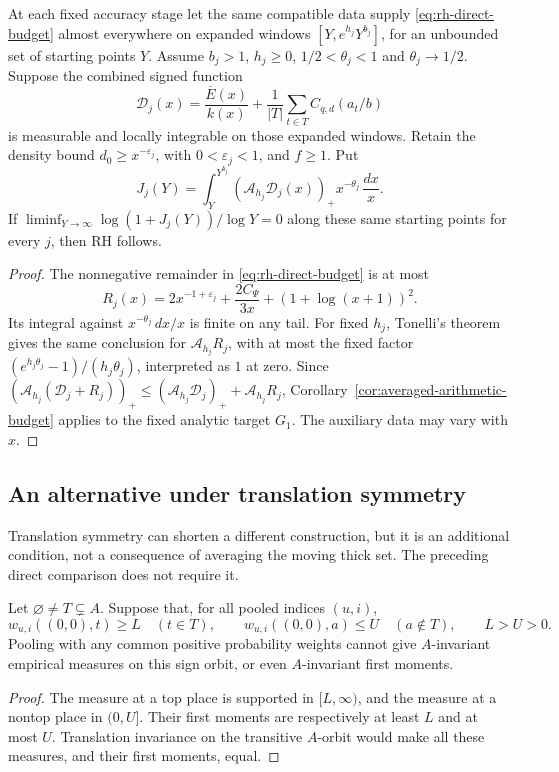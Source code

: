 \begin{corollary}
\label{rh-averaged-final}
At each fixed accuracy stage let the same compatible data supply
\eqref{eq:rh-direct-budget} almost everywhere on expanded windows
$[Y,e^{h_j}Y^{b_j}]$, for an unbounded set of starting points $Y$.
Assume $b_j>1$, $h_j\ge0$, $1/2<\theta_j<1$ and
$\theta_j\to1/2$. Suppose the combined signed function
\[
 \mathcal D_j(x)=\frac{\overline E(x)}{k(x)}
   +\frac1{|T|}\sum_{t\in T} C_{q,d}(a_t/b)
\]
is measurable and locally integrable on those expanded windows.
Retain the density bound $d_0\ge x^{-\varepsilon_j}$, with
$0<\varepsilon_j<1$, and $f\ge1$.
Put
\[
 J_j(Y)=\int_Y^{Y^{b_j}}(\mathcal A_{h_j}\mathcal D_j(x))_+
                   x^{-\theta_j}\,\frac{dx}{x}.
\]
If $\liminf_{Y\to\infty}\log(1+J_j(Y))/\log Y=0$ along these same
starting points for every $j$, then RH follows.
\end{corollary}
\begin{proof}
The nonnegative remainder in \eqref{eq:rh-direct-budget} is at most
\[
 R_j(x)=2x^{-1+\varepsilon_j}+\frac{2C_\Psi}{3x}
                         +(1+\log(x+1))^2.
\]
Its integral against $x^{-\theta_j}\,dx/x$ is finite on any tail.
For fixed $h_j$, Tonelli's theorem gives the same conclusion for
$\mathcal A_{h_j}R_j$, with at most the fixed factor
$(e^{h_j\theta_j}-1)/(h_j\theta_j)$, interpreted as $1$ at zero.
Since $(\mathcal A_{h_j}(\mathcal D_j+R_j))_+
\le(\mathcal A_{h_j}\mathcal D_j)_++\mathcal A_{h_j}R_j$,
Corollary~\ref{cor:averaged-arithmetic-budget} applies to the fixed
analytic target $G_1$. The auxiliary data may vary with $x$.
\end{proof}

\subsection{An alternative under translation symmetry}

Translation symmetry can shorten a different construction, but it is
an additional condition, not a consequence of averaging the moving
thick set. The preceding direct comparison does not require it.

\begin{lemma}
\label{rh-separated-support-obstruction}
Let $\varnothing\ne T\subsetneq A$. Suppose that, for all pooled
indices $(u,i)$,
\[
 w_{u,i}((0,0),t)\ge L\quad(t\in T),\qquad
 w_{u,i}((0,0),a)\le U\quad(a\notin T),
 \qquad L>U>0.
\]
Pooling with any common positive probability weights cannot give
$A$-invariant empirical measures on this sign orbit, or even
$A$-invariant first moments.
\end{lemma}
\begin{proof}
The measure at a top place is supported in $[L,\infty)$, and the
measure at a nontop place in $(0,U]$. Their first moments are
respectively at least $L$ and at most $U$. Translation invariance
on the transitive $A$-orbit would make all these measures, and their
first moments, equal.
\end{proof}

